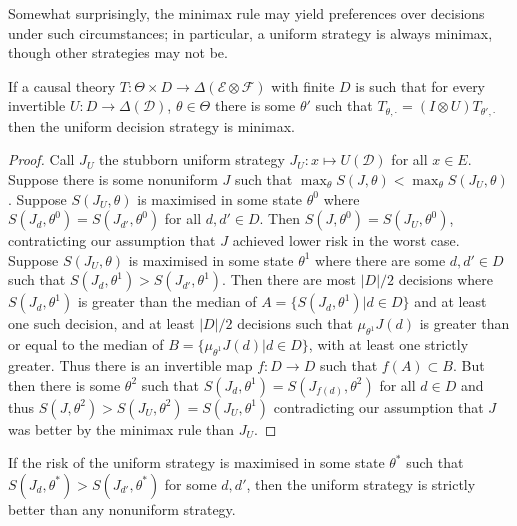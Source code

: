 Somewhat surprisingly, the minimax rule may yield preferences over decisions under such circumstances; in particular, a uniform strategy is always minimax, though other strategies may not be.

\begin{theorem}
If a causal theory $T:\Theta\times D\to \Delta(\mathcal{E}\otimes\mathcal{F})$ with finite $D$ is such that for every invertible $U:D\to \Delta(\mathcal{D})$, $\theta\in \Theta$ there is some $\theta'$ such that $T_{\theta,\cdot} = (I\otimes U)T_{\theta',\cdot}$ then the uniform decision strategy is minimax.
\end{theorem}

\begin{proof}
Call $J_U$ the stubborn uniform strategy $J_U:x\mapsto U(\mathcal{D})$ for all $x\in E$. Suppose there is some nonuniform $J$ such that $\max_\theta S(J,\theta) < \max_\theta S(J_U,\theta)$. Suppose $S(J_U,\theta)$ is maximised in some state $\theta^0$ where $S(J_d,\theta^0)=S(J_{d'},\theta^0)$ for all $d,d'\in D$. Then $S(J,\theta^0)=S(J_U,\theta^0)$, contraticting our assumption that $J$ achieved lower risk in the worst case. Suppose $S(J_U,\theta)$ is maximised in some state $\theta^1$ where there are some $d,d'\in D$ such that $S(J_d,\theta^1)>S(J_{d'},\theta^1)$. Then there are most $|D|/2$ decisions where $S(J_d,\theta^1)$ is greater than the median of $A=\{S(J_d,\theta^1)|d\in D\}$ and at least one such decision, and at least $|D|/2$ decisions such that $\mu_{\theta^1} J(d)$ is greater than or equal to the median of $B=\{\mu_{\theta^1} J(d)|d\in D\}$, with at least one strictly greater. Thus there is an invertible map $f:D\to D$ such that $f(A)\subset B$. But then there is some $\theta^2$ such that $S(J_d,\theta^1)=S(J_{f(d)},\theta^2)$ for all $d\in D$ and thus $S(J,\theta^2)> S(J_U,\theta^2) = S(J_U,\theta^1)$ contradicting our assumption that $J$ was better by the minimax rule than $J_U$.
\end{proof}

\begin{corollary}
If the risk of the uniform strategy is maximised in some state $\theta^*$ such that $S(J_d,\theta^*)>S(J_{d'},\theta^*)$ for some $d,d'$, then the uniform strategy is strictly better than any nonuniform strategy.
\end{corollary}